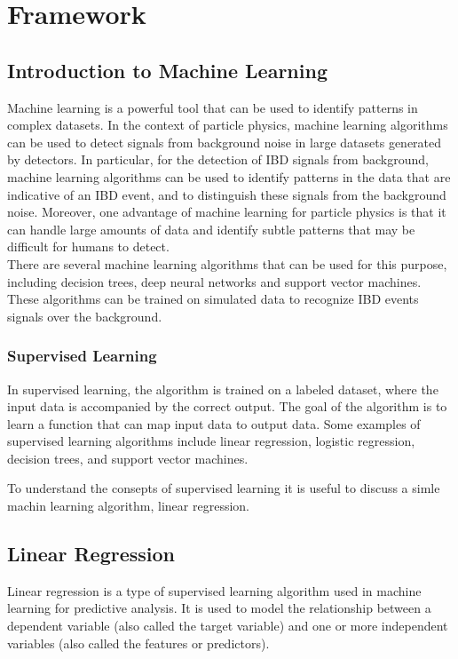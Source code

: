 \chapter{Framework}
\section{Introduction to Machine Learning}

Machine learning is a powerful tool that can be used to identify patterns in complex datasets. In the context of particle physics, machine learning algorithms can be used to detect signals from background noise in large datasets generated by detectors. In particular, for the detection of IBD signals from background, machine learning algorithms can be used to identify patterns in the data that are indicative of an IBD event, and to distinguish these signals from the background noise. Moreover, one advantage of machine learning for particle physics is that it can handle large amounts of data and identify subtle patterns that may be difficult for humans to detect.
\\

There are several machine learning algorithms that can be used for this purpose, including decision trees, deep neural networks and support vector machines. These algorithms can be trained on simulated data to recognize IBD events signals over the background. 


\subsection{Supervised Learning}

In supervised learning, the algorithm is trained on a labeled dataset, where the input data is accompanied by the correct output. The goal of the algorithm is to learn a function that can map input data to output data. Some examples of supervised learning algorithms include linear regression, logistic regression, decision trees, and support vector machines.

To understand the consepts of supervised learning it is useful to discuss a simle machin learning algorithm, linear regression. 

\section{Linear Regression}
Linear regression is a type of supervised learning algorithm used in machine learning for predictive analysis. It is used to model the relationship between a dependent variable (also called the target variable) and one or more independent variables (also called the features or predictors).

